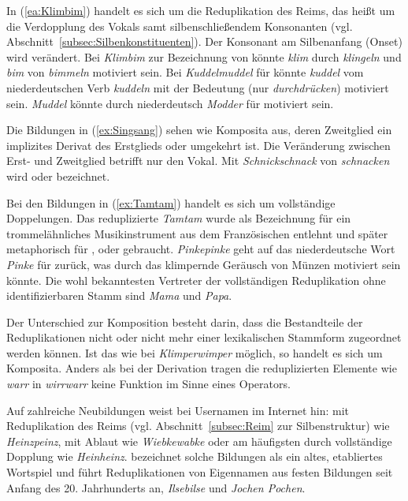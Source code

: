In (\ref{ea:Klimbim}) handelt es sich um die Reduplikation des Reims, das heißt um die Verdopplung des Vokals samt silbenschließendem Konsonanten (vgl. Abschnitt~\ref{subsec:Silbenkonstituenten}). Der Konsonant am Silbenanfang (Onset) wird verändert. Bei \textit{Klimbim} zur Bezeichnung von  könnte \textit{klim} durch \textit{klingeln} und \textit{bim} von \textit{bimmeln} motiviert sein. Bei \textit{Kuddelmuddel} für  könnte \textit{kuddel} vom niederdeutschen Verb \textit{kuddeln} mit der Bedeutung  (nur \textit{durchdrücken}) motiviert sein. \textit{Muddel} könnte durch niederdeutsch \textit{Modder} für  motiviert sein.

Die Bildungen in (\ref{ex:Singsang}) sehen wie Komposita aus, deren Zweitglied ein implizites Derivat des Erstglieds oder umgekehrt ist. Die Veränderung zwischen Erst- und Zweitglied betrifft nur den Vokal. Mit \textit{Schnickschnack} von \textit{schnacken} wird  oder  bezeichnet.

Bei den Bildungen in (\ref{ex:Tamtam}) handelt es sich um vollständige Doppelungen. Das reduplizierte \textit{Tamtam} wurde als Bezeichnung für ein trommelähnliches Musikinstrument aus dem Französischen entlehnt und später metaphorisch für ,  oder  gebraucht. \textit{Pinkepinke} geht auf das niederdeutsche Wort \textit{Pinke} für  zurück, was durch das klimpernde Geräusch von Münzen motiviert sein könnte. Die wohl bekanntesten Vertreter der vollständigen Reduplikation ohne identifizierbaren Stamm sind \textit{Mama} und \textit{Papa}.

Der Unterschied zur Komposition besteht darin, dass die Bestandteile der Reduplikationen nicht oder nicht mehr einer lexikalischen Stammform zugeordnet werden können. Ist das wie bei \textit{Klimperwimper} möglich, so handelt es sich um Komposita. Anders als bei der Derivation tragen die reduplizierten Elemente wie \textit{warr} in \textit{wirrwarr} keine Funktion im Sinne eines Operators. 

Auf zahlreiche Neubildungen weist \citet[9]{Kentner2017} bei Usernamen im Internet hin: mit Reduplikation des Reims (vgl. Abschnitt~\ref{subsec:Reim} zur Silbenstruktur) wie \textit{Heinzpeinz}, mit Ablaut wie \textit{Wiebkewabke} oder am häufigsten durch vollständige Dopplung wie \textit{Heinheinz}. \citet[912]{Freywald2015} bezeichnet solche Bildungen als ein altes, etabliertes Wortspiel und führt Reduplikationen von Eigennamen aus festen Bildungen seit Anfang des 20. Jahrhunderts an, \zB \textit{Ilsebilse} und \textit{Jochen Pochen}.

